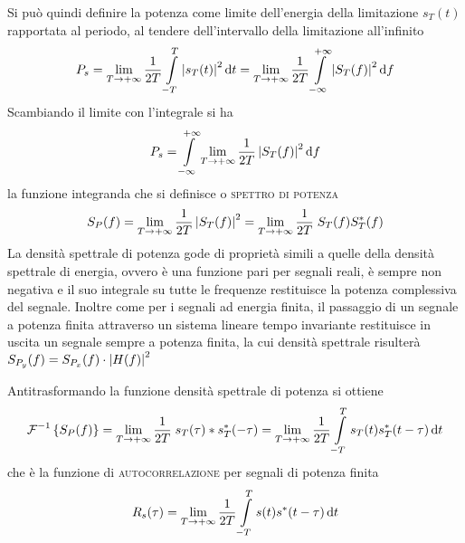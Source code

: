 Si può quindi definire la potenza come limite dell'energia della limitazione $s_T(t)$ rapportata al periodo, al tendere dell'intervallo della limitazione all'infinito
\[P_s=\lim\limits_{T\to+\infty}{\frac{1}{2T}\int\limits_{-T}^{T}{\left|{s_T(t)}\right|^2}{\,\mathop{}\!\mathrm{d}{t}}}=\lim\limits_{T\to+\infty}{\frac{1}{2T}\int\limits_{-\infty}^{+\infty}{\left|{S_T(f)}\right|^2}{\,\mathop{}\!\mathrm{d}{f}}}\]
Scambiando il limite con l'integrale si ha 
\[P_s=\int\limits_{-\infty}^{+\infty}{\lim\limits_{T\to+\infty}\frac{1}{2T}\left|{S_T(f)}\right|^2}{\,\mathop{}\!\mathrm{d}{f}}\]
la funzione integranda che si definisce  o \textsc{spettro di potenza}
\begin{equation}
S_P(f)=\lim\limits_{T\to+\infty}{\frac{1}{2T}\left|{S_T(f)}\right|^2}=\lim\limits_{T\to+\infty}{\frac{1}{2T}\;S_T(f)S_{T}^\ast(f)}
\end{equation}
La densità spettrale di potenza gode di proprietà simili a quelle della densità spettrale di energia, ovvero è una funzione pari per segnali reali, è sempre non negativa e il suo integrale su tutte le frequenze restituisce la potenza complessiva del segnale.
Inoltre come per i segnali ad energia finita, il passaggio di un segnale a potenza finita attraverso un sistema lineare tempo invariante restituisce in uscita un segnale sempre a potenza finita, la cui densità spettrale risulterà $S_{P_y}(f)=S_{P_x}(f)\cdot\left|{H(f)}\right|^2$

Antitrasformando la funzione densità spettrale di potenza si ottiene 
\[\operatorname{\mathcal{F}}^{-1}\left\lbrace{S_P(f)}\right\rbrace=\lim\limits_{T\to+\infty}{\frac{1}{2T}\;s_T(\tau)\ast s_{T}^\ast(-\tau)}=\lim\limits_{T\to+\infty}{\frac{1}{2T}\int\limits_{-T}^{T}{s_T(t)s_{T}^\ast(t-\tau)}{\,\mathop{}\!\mathrm{d}{t}}}\]
che è la funzione di \textsc{autocorrelazione} per segnali di potenza finita
\begin{equation}R_s(\tau)=\lim\limits_{T\to+\infty}{\frac{1}{2T}\int\limits_{-T}^{T}{s(t){s}^\ast(t-\tau)}{\,\mathop{}\!\mathrm{d}{t}}}\end{equation}

